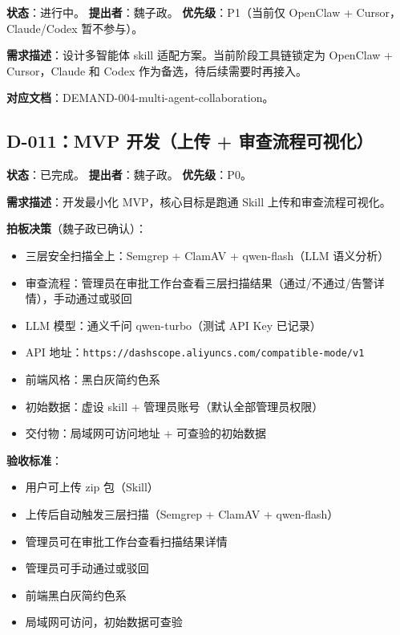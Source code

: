 \documentclass[11pt,a4paper]{article}
\begin{document}
\textbf{状态}：进行中。
\textbf{提出者}：魏子政。
\textbf{优先级}：\textcolor{warning}{P1}（当前仅 OpenClaw + Cursor，Claude/Codex 暂不参与）。

\textbf{需求描述}：设计多智能体 skill 适配方案。当前阶段工具链锁定为 OpenClaw + Cursor，Claude 和 Codex 作为备选，待后续需要时再接入。

\textbf{对应文档}：DEMAND-004-multi-agent-collaboration。

\subsection{D-011：MVP 开发（上传 + 审查流程可视化）}

\textbf{状态}：已完成。
\textbf{提出者}：魏子政。
\textbf{优先级}：\textcolor{danger}{P0}。

\textbf{需求描述}：开发最小化 MVP，核心目标是跑通 Skill 上传和审查流程可视化。

\textbf{拍板决策}（魏子政已确认）：
\begin{itemize}[nosep]
  \item 三层安全扫描全上：Semgrep + ClamAV + qwen-flash（LLM 语义分析）
  \item 审查流程：管理员在审批工作台查看三层扫描结果（通过/不通过/告警详情），手动通过或驳回
  \item LLM 模型：通义千问 qwen-turbo（测试 API Key 已记录）
  \item API 地址：\texttt{https://dashscope.aliyuncs.com/compatible-mode/v1}
  \item 前端风格：黑白灰简约色系
  \item 初始数据：虚设 skill + 管理员账号（默认全部管理员权限）
  \item 交付物：局域网可访问地址 + 可查验的初始数据
\end{itemize}

\textbf{验收标准}：
\begin{itemize}[nosep]
  \item[\checkmark] 用户可上传 zip 包（Skill）
  \item[\checkmark] 上传后自动触发三层扫描（Semgrep + ClamAV + qwen-flash）
  \item[\checkmark] 管理员可在审批工作台查看扫描结果详情
  \item[\checkmark] 管理员可手动通过或驳回
  \item[\checkmark] 前端黑白灰简约色系
  \item[\checkmark] 局域网可访问，初始数据可查验
\end{itemize}
\end{document}
